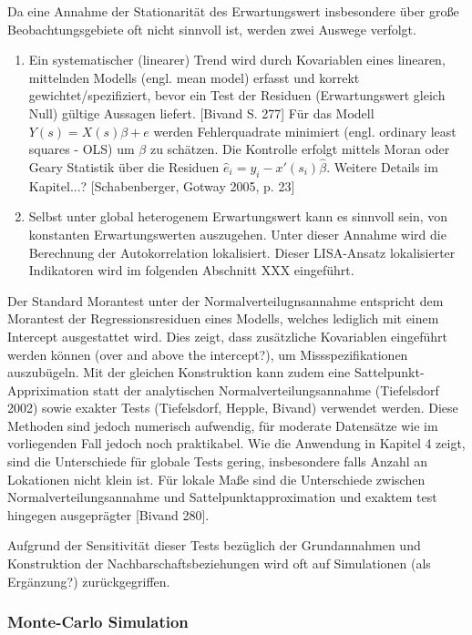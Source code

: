 Da eine Annahme der Stationarität des Erwartungswert insbesondere über große Beobachtungsgebiete oft nicht sinnvoll ist, werden zwei Auswege verfolgt.
\begin{enumerate}
    \item Ein systematischer (linearer) Trend wird durch Kovariablen eines linearen, mittelnden Modells (engl. mean model) erfasst und korrekt gewichtet/spezifiziert, 
    bevor ein Test der Residuen (Erwartungswert gleich Null) gültige Aussagen liefert. [Bivand S. 277] 
    Für das Modell $Y(s)=X(s)\beta+e$ werden Fehlerquadrate minimiert (engl. ordinary least squares - OLS) um $\beta$ zu schätzen. 
    Die Kontrolle erfolgt mittels Moran oder Geary Statistik über die Residuen $\hat{e}_i=y_i-x\prime(s_i) \hat{\beta}$. 
    Weitere Details im Kapitel...? [Schabenberger, Gotway 2005, p. 23]
    \item  Selbst unter global heterogenem Erwartungswert kann es sinnvoll sein, von konstanten Erwartungswerten auszugehen. 
    Unter dieser Annahme wird die Berechnung der Autokorrelation lokalisiert. 
    Dieser LISA-Ansatz lokalisierter Indikatoren wird im folgenden Abschnitt XXX eingeführt.
\end{enumerate}

Der Standard Morantest unter der Normalverteilugnsannahme entspricht dem Morantest der Regressionsresiduen eines Modells, welches lediglich mit einem Intercept ausgestattet wird. 
Dies zeigt, dass zusätzliche Kovariablen eingeführt werden können (over and above the intercept?), um Missspezifikationen auszubügeln. 
Mit der gleichen Konstruktion kann zudem eine Sattelpunkt-Appriximation statt der analytischen Normalverteilungsannahme (Tiefelsdorf 2002) 
sowie exakter Tests (Tiefelsdorf, Hepple, Bivand) verwendet werden. 
Diese Methoden sind jedoch numerisch aufwendig, für moderate Datensätze wie im vorliegenden Fall jedoch noch praktikabel. 
Wie die Anwendung in Kapitel 4 zeigt, sind die Unterschiede für globale Tests gering, insbesondere falls Anzahl an Lokationen nicht klein ist. 
Für lokale Maße sind die Unterschiede zwischen Normalverteilungsannahme und Sattelpunktapproximation und exaktem test hingegen ausgeprägter [Bivand 280].

Aufgrund der Sensitivität dieser Tests bezüglich der Grundannahmen und Konstruktion der Nachbarschaftsbeziehungen wird oft auf Simulationen (als Ergänzung?) zurückgegriffen.

\subsubsection{Monte-Carlo Simulation}


